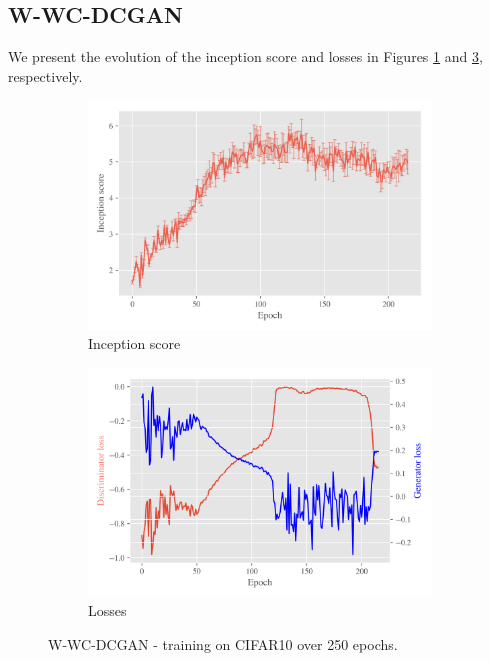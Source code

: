 \subsection{W-WC-DCGAN}
\label{sec:exp-w-wc-dcgan}
We present the evolution of the inception score and losses in Figures \ref{fig:exp-w-wc-dcgan-is} and \ref{fig:exp-w-wc-dcgan-losses}, respectively.
   
\begin{figure}[t!]
    \centering
    \begin{subfigure}[t]{0.49\textwidth}
        \centering
		\includegraphics[width=\textwidth]{../code/results/figures/w-wc-dcgan_cifar10_is.png}
		\caption{Inception score}
		\label{fig:exp-w-wc-dcgan-is}
    \end{subfigure}
    \begin{subfigure}[t]{0.49\textwidth}
        \centering
        \includegraphics[width=\textwidth]{../code/results/figures/w-wc-dcgan_cifar10_losses.png}
		\caption{Losses}
		\label{fig:exp-w-wc-dcgan-losses}
    \end{subfigure}
    \caption{W-WC-DCGAN - training on CIFAR10 over 250 epochs.}
\end{figure}